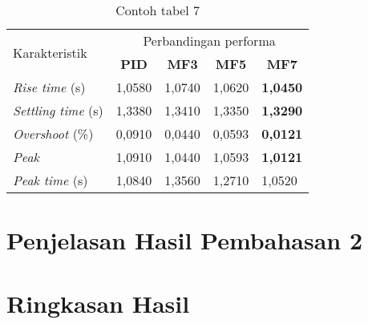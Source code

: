 \begin{table}[H]
    \centering
    \caption{Contoh tabel 7}
    \label{t perbandinganRespon}
    \begin{tabular}{lllll}
        \hline
        \multirow{2}{*}{Karakteristik} & \multicolumn{4}{c}{Perbandingan performa} \\ \cline{2-5} 
        & \multicolumn{1}{c}{\textbf{PID}} & \multicolumn{1}{c}{\textbf{MF3}} & \multicolumn{1}{c}{\textbf{MF5}} & \multicolumn{1}{c}{\textbf{MF7}} \\ \hline
        \textit{Rise time} (s)  & 1,0580  & 1,0740  & 1,0620    & \textbf{1,0450} \\
        \textit{Settling time} (s) & 1,3380 & 1,3410  & 1,3350  & \textbf{1,3290} \\
        \textit{Overshoot} (\%) & 0,0910 & 0,0440  & 0,0593     & \textbf{0,0121} \\
        \textit{Peak} & 1,0910 & 1,0440 & 1,0593 & \textbf{1,0121} \\
        \textit{Peak time} (s) & 1,0840 & 1,3560  & 1,2710      & 1,0520  \\ \hline
    \end{tabular}
\end{table}

\section{Penjelasan Hasil Pembahasan 2}
\lipsum[1]


\section{Ringkasan Hasil}
\lipsum[1]